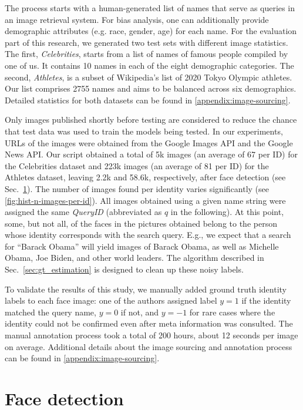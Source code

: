 \documentclass[10pt,twocolumn,letterpaper]{article}
\begin{document}
The process starts with a human-generated list of names that serve as queries in an image retrieval system.
For bias analysis, one can additionally provide demographic attributes (e.g. race, gender, age) for each name. For the evaluation part of this research, we generated two test sets with different image statistics. The first, {\em Celebrities}, starts from a list of names of famous people compiled by one of us. It contains 10 names in each of the eight demographic categories. 
The second, {\em Athletes}, is a subset of Wikipedia's list of 2020 Tokyo Olympic athletes. 
Our list comprises 2755 names and aims to be balanced across six demographics. Detailed statistics for both datasets can be found in \cref{appendix:image-sourcing}.

Only images published shortly before testing are considered to reduce the chance that test data was used to train the models being tested. In our experiments, URLs of the images were obtained from the Google Images API and the Google News API. 
Our script obtained a total of 5k images (an average of 67 per ID) for the Celebrities dataset and 223k images (an average of 81 per ID) for the Athletes dataset, leaving 2.2k and 58.6k, respectively, after face detection (see Sec.~\ref{sec:face-detection}).
The number of images found per identity varies significantly (see \cref{fig:hist-n-images-per-id}).
All images obtained using a given name string were assigned the same \textit{QueryID} (abbreviated as $q$ in the following). At this point, some, but not all, of the faces in the pictures obtained belong to the person whose identity corresponds with the search query. E.g., we expect that a search for ``Barack Obama'' will yield images of Barack Obama, as well as Michelle Obama, Joe Biden, and other world leaders. The algorithm described in Sec.~\ref{sec:gt_estimation} is designed to clean up these noisy labels.

To validate the results of this study, we manually added ground truth identity labels to each face image: one of the authors assigned label $y=1$ if the identity matched the query name, $y=0$ if not, and $y=-1$ for rare cases where the identity could not be confirmed even after meta information was consulted. The manual annotation process took a total of 200 hours, about 12 seconds per image on average.
Additional details about the image sourcing and annotation process can be found in \cref{appendix:image-sourcing}.

\section{Face detection}
\label{sec:face-detection}
\end{document}
